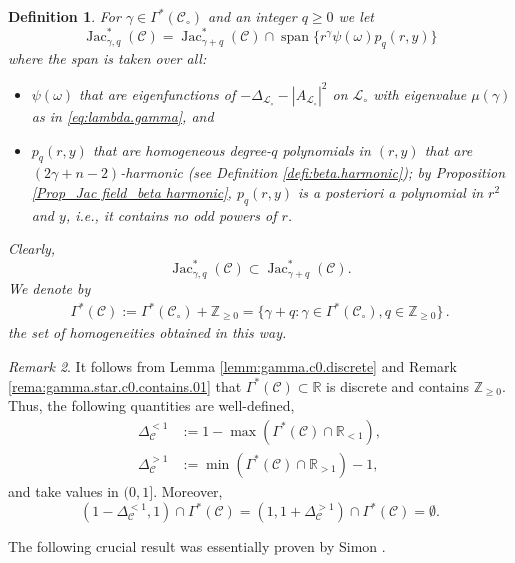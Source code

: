 \documentclass[11pt, letterpaper, reqno]{amsart}
\numberwithin{equation}{section}
\newtheorem{Def}{Definition}[section]
\theoremstyle{remark}
\newtheorem{Rem}[Def]{Remark}
\newcommand{\RR}{\mathbb{R}}
\newcommand{\ZZ}{\mathbb{Z}}
\newcommand{\cC}{\mathcal{C}}
\newcommand{\cL}{\mathcal{L}}
\newcommand{\Jac}{\operatorname{Jac}}
\begin{document}
\begin{Def} \label{defi:jac.c.star.gamma.q}
	For $\gamma \in \Gamma^*(\cC_\circ)$ and an integer $q\geq 0$ we let
\[ \Jac^*_{\gamma,q}(\cC) = \Jac^*_{\gamma+q}(\cC) \cap \operatorname{span} \{ r^{\gamma} \psi(\omega) p_q(r,y) \} \]
where the span is taken over all:
\begin{itemize}
	\item $\psi(\omega)$ that are eigenfunctions of $-\Delta_{\cL_\circ}-|A_{\cL_\circ}|^2$ on $\cL_\circ$ with eigenvalue $\mu(\gamma)$ as in \eqref{eq:lambda.gamma}, and
	\item $p_q(r,y)$ that are homogeneous degree-$q$ polynomials in $(r, y)$ that are $(2\gamma+n-2)$-harmonic (see Definition \ref{defi:beta.harmonic}); by Proposition \ref{Prop_Jac field_beta harmonic}, $p_q(r,y)$ is a posteriori a polynomial in $r^2$ and $y$, i.e., it contains no odd powers of $r$. 
\end{itemize}
Clearly,
\[
\Jac^*_{\gamma,q}(\cC) \subset \Jac^*_{\gamma+q}(\cC).
\]
We denote by
    \begin{align}
      \Gamma^*(\cC) := \Gamma^*(\cC_\circ)+\ZZ_{\geq 0} = \{\gamma+q: \gamma\in \Gamma^*(\cC_\circ), q\in \ZZ_{\geq 0}\}\,. \label{Equ_Jac field_Asymp Spectrum of C=C_0*R^k}
    \end{align}
    the set of homogeneities obtained in this way. 
\end{Def}


\begin{Rem} \label{rema:gamma.star.c}
	It follows from Lemma \ref{lemm:gamma.c0.discrete} and Remark \ref{rema:gamma.star.c0.contains.01} that $\Gamma^*(\cC) \subset \RR$ is discrete and contains $\ZZ_{\geq 0}$. Thus, the following quantities are well-defined,
	\begin{align*}
		\Delta_\cC^{<1} & := 1 - \max (\Gamma^*(\cC)\cap \RR_{<1}), \\
		\Delta_\cC^{>1} & := \min (\Gamma^*(\cC)\cap \RR_{>1}) - 1,
	\end{align*}
	and take values in $(0, 1]$. Moreover,
	\[ (1-\Delta_\cC^{<1}, 1) \cap \Gamma^*(\cC) = (1, 1+\Delta_\cC^{>1}) \cap \Gamma^*(\cC) = \emptyset. \]
\end{Rem}


The following crucial result was essentially proven by Simon \cite[Section 3]{Simon:liouville}. 
\end{document}
